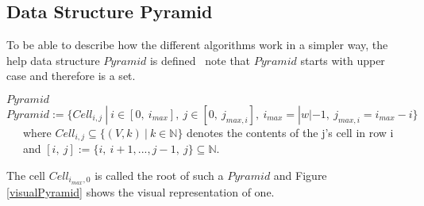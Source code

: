 \subsection{Data Structure Pyramid} \label{dataStructurePyramid}
To be able to describe how the different algorithms work in a simpler way, the help data structure $Pyramid$ is defined \textendash~note that $Pyramid$ starts with upper case and therefore is a set.
\begin{DefGrey} \textbf{$Pyramid$} \\
	$Pyramid :=\{ Cell_{i,j}\ |\ i \in [0,\ i_{max}],\  j \in [0,\ j_{max,i}],\ i_{max} = |w|-1,~j_{max,i} = i_{max} -i\}$\\
	~~~where $Cell_{i,j} \subseteq \{(V,k)~|~k \in \mathbb{N} \}$ denotes the contents of the j's cell in row i\\
	~~~and $[i,\ j] := \{i,\ i+1,..., j-1,\ j\} \subseteq \mathbb{N}$.
\end{DefGrey}
\noindent The cell $Cell_{i_{max},0}$ is called the root of such a $Pyramid$ and Figure \ref{visualPyramid} shows the visual representation of one.
\newcommand{\boxpyramid}[1]{
	\fontsize{5}{12}\selectfont{#1}
}
